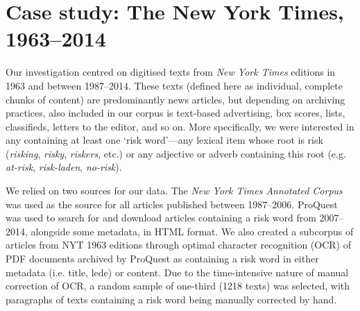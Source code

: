 
\chapter{Case study: The New York Times, 1963--2014}

	Our investigation centred on digitised texts from \emph{New York Times} editions in 1963 and between 1987--2014. These texts (defined here as individual, complete chunks of content) are predominantly news articles, but depending on archiving practices, also included in our corpus is text-based advertising, box scores, lists, classifieds, letters to the editor, and so on. More specifically, we were interested in any  containing at least one `risk word'---any lexical item whose root is risk (\emph{risking}, \emph{risky}, \emph{riskers}, etc.) or any adjective or adverb containing this root (e.g. \emph{at-risk}, \emph{risk-laden}, \emph{no-risk}).~

	We relied on two sources for our data. The \emph{New York Times Annotated Corpus} \cite{sandhaus_new_2008} was used as the source for all articles published between 1987--2006. ProQuest was used to search for and download articles containing a risk word from 2007--2014, alongside some metadata, in HTML format. We also created a subcorpus of articles from NYT 1963 editions through optimal character recognition (OCR) of PDF documents archived by ProQuest as containing a risk word in either metadata (i.e. title, lede) or content. Due to the time-intensive nature of manual correction of OCR, a random sample of one-third (1218 texts) was selected, with paragraphs of texts containing a risk word being manually corrected by hand.

